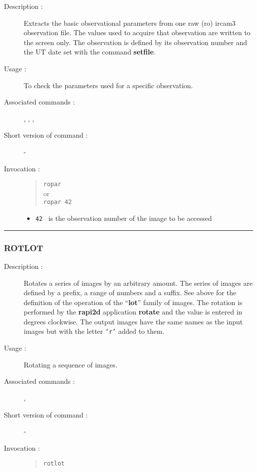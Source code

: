 \begin{description}

\item[Description :] Extracts the basic observational parameters from
one raw ({\sc ro}) {\sc ircam3} observation file.  The values used to
acquire that observation are written to the screen only.  The
observation is defined by its observation number and the UT date set
with the command {\bf setfile}.

\item[Usage :] To check the parameters used for a specific observation.

\item[Associated commands :] {\tt {}},
{\tt {}}, {\tt {}},
{\tt {}}

\item[Short version of command :] -
\item[Invocation :]

\begin{quote}{\tt  ropar }\\
or \\
{\tt ropar 42 }
\end{quote}

\begin{itemize}

\item {\tt 42 } is the observation number of the image to be accessed
\end{itemize}

\end{description}

\hrule
\subsubsection*{\label{ROTLOT}ROTLOT}

\begin{description}

\item[Description :] Rotates a series of images by an arbitrary
amount.  The series of images are defined by a prefix, a range of
numbers and a suffix. See above for the definition of the operation of
the ``{\bf lot}'' family of images.  The rotation is performed by the
{\bf rapi2d} application {\bf rotate} and the value is entered in
degrees clockwise.  The output images have the same names as the input
images but with the letter {\tt `r'} added to them.

\item[Usage :] Rotating a sequence of images.

\item[Associated commands :] {\tt {}},
{\tt {}}

\item[Short version of command :] -
\item[Invocation :]

\begin{quote}{\tt  rotlot }\end{quote}

\end{description}

